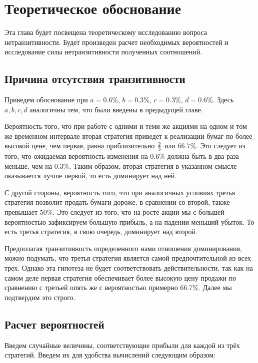 \chapter{Теоретическое обоснование}

Эта глава будет посвещена теоретическому исследованию вопроса нетранзитивности. Будет произведен расчет необходимых вероятностей и исследование силы нетранзитивности полученных соотношений.

\section{Причина отсутствия транзитивности}

Приведем обоснование при $a = 0.6\%$, $b = 0.3\%$, $c = 0.3\%$, $d = 0.6\%$. Здесь $a, b, c, d$ аналогичны тем, что были введены в предыдущей главе.
\smallskip
\smallskip

Вероятность того, что при работе с одними и теми же акциями на одном и том же временном интервале вторая стратегия приведет к реализации бумаг по более высокой цене, чем первая, равна приблизительно $2 \over 3$ или $66.7\%$. Это следует из того, что ожидаемая вероятность изменения на $0.6\%$ должна быть в два раза меньше, чем на $0.3\%$. Таким образом, вторая стратегия в указанном смысле оказывается лучше первой, то есть доминирует над ней. 
\smallskip
\smallskip

С другой стороны, вероятность того, что при аналогичных условиях третья стратегия позволит продать бумаги дороже, в сравнении со второй, также превышает $50\%$. Это следует из того, что на росте акции мы с большей вероятностью зафиксируем большую прибыль, а на падении меньший убыток. То есть третья стратегия, в свою очередь, доминирует над второй.
\smallskip
\smallskip

Предполагая транзитивность определенного нами отношения доминирования, можно подумать, что третья стратегия является самой предпочтительной из всех трех. Однако эта гипотеза не будет соответствовать действительности, так как на самом деле первая стратегия обеспечивает более высокую цену продажи по сравнению с третьей опять же с вероятностью примерно $66.7\%$. Далее мы подтвердим это строго.

\section{Расчет вероятностей}

Введем случайные величины, соответствующие прибыли для каждой из трёх стратегий. Введем их для удобства вычислений следующим образом:

